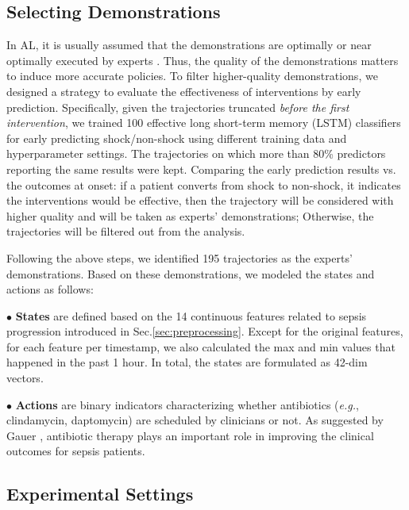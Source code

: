 \documentclass{article}
\begin{document}
\subsection{Selecting Demonstrations}
In AL, it is usually assumed that the demonstrations are optimally or near optimally executed by experts \cite{abbeel2004apprenticeship}. Thus, the quality of the demonstrations matters to induce more accurate policies. To filter higher-quality demonstrations, we designed a strategy to evaluate the effectiveness of interventions by early prediction. Specifically, given the trajectories truncated \emph{before the first intervention}, we trained 100 effective long short-term memory (LSTM) classifiers \cite{baytas2017patient} for early predicting shock/non-shock using different training data and hyperparameter settings. The trajectories on which more than 80\% predictors reporting the same results were kept. Comparing the early prediction results vs. the outcomes at onset: if a patient converts from shock to non-shock, it indicates the interventions would be effective, then the trajectory will be considered with higher quality and will be taken as experts' demonstrations; Otherwise, the trajectories will be filtered out from the analysis. 

Following the above steps, we identified 195 trajectories as the experts' demonstrations. Based on these demonstrations, we modeled the states and actions as follows: 

\noindent $\bullet$ \textbf{States} are defined based on the 14 continuous features related to sepsis progression introduced in Sec.\ref{sec:preprocessing}. Except for the original features, for each feature per timestamp, we also calculated the max and min values that happened in the past 1 hour. In total, the states are formulated as 42-dim vectors. 

\noindent $\bullet$ \textbf{Actions} are binary indicators characterizing whether antibiotics (\textit {e.g.}, clindamycin, daptomycin) are scheduled by clinicians or not. As suggested by Gauer \cite{gauer2013early}, antibiotic therapy plays an important role in improving the clinical outcomes for sepsis patients. 


\subsection{Experimental Settings}
\end{document}
